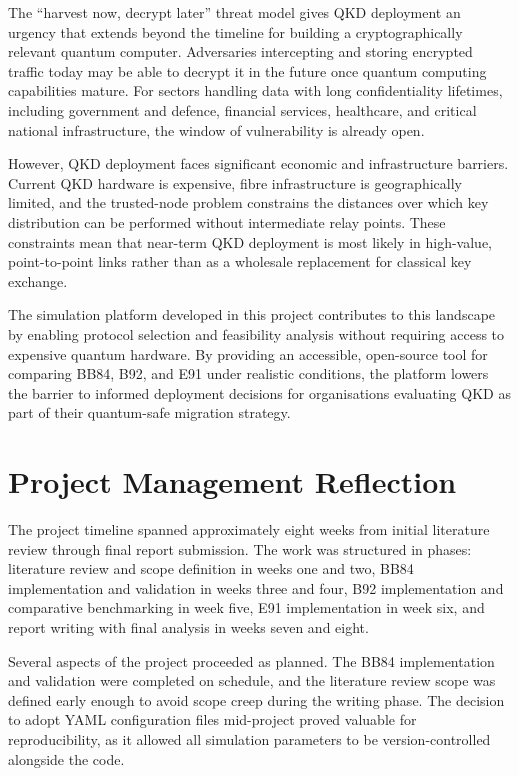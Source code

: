 The ``harvest now, decrypt later'' threat model gives QKD deployment an urgency that extends beyond the timeline for building a cryptographically relevant quantum computer. Adversaries intercepting and storing encrypted traffic today may be able to decrypt it in the future once quantum computing capabilities mature. For sectors handling data with long confidentiality lifetimes, including government and defence, financial services, healthcare, and critical national infrastructure, the window of vulnerability is already open.

However, QKD deployment faces significant economic and infrastructure barriers. Current QKD hardware is expensive, fibre infrastructure is geographically limited, and the trusted-node problem constrains the distances over which key distribution can be performed without intermediate relay points. These constraints mean that near-term QKD deployment is most likely in high-value, point-to-point links rather than as a wholesale replacement for classical key exchange.

The simulation platform developed in this project contributes to this landscape by enabling protocol selection and feasibility analysis without requiring access to expensive quantum hardware. By providing an accessible, open-source tool for comparing BB84, B92, and E91 under realistic conditions, the platform lowers the barrier to informed deployment decisions for organisations evaluating QKD as part of their quantum-safe migration strategy.



\section{Project Management Reflection}

The project timeline spanned approximately eight weeks from initial literature review through final report submission. The work was structured in phases: literature review and scope definition in weeks one and two, BB84 implementation and validation in weeks three and four, B92 implementation and comparative benchmarking in week five, E91 implementation in week six, and report writing with final analysis in weeks seven and eight.

Several aspects of the project proceeded as planned. The BB84 implementation and validation were completed on schedule, and the literature review scope was defined early enough to avoid scope creep during the writing phase. The decision to adopt YAML configuration files mid-project proved valuable for reproducibility, as it allowed all simulation parameters to be version-controlled alongside the code.

